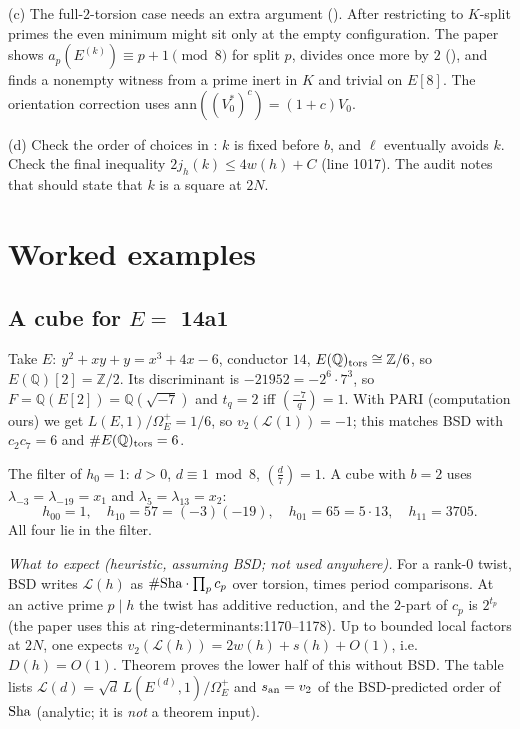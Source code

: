 \documentclass[11pt]{article}
\theoremstyle{remark}
\newcommand{\Q}{\mathbb Q}
\newcommand{\Z}{\mathbb Z}
\newcommand{\cL}{\mathcal L}
\newcommand{\Sha}{\text{\rm Sha}}
\newcommand{\src}[2]{\textsf{\small #1:#2}}
\begin{document}
(c) The full-$2$-torsion case needs an extra argument
(). After restricting to $K$-split primes the even
minimum might sit only at the empty configuration. The paper shows
$a_p(E^{(k)})\equiv p+1\pmod8$ for split $p$, divides once more by $2$
(), and finds a nonempty witness from a prime inert
in $K$ and trivial on $E[8]$. The orientation correction
 uses $\mathrm{ann}((V_0^*)^c)=(1+c)V_0$.

(d) Check the order of choices in : $k$ is fixed before
$b$, and $\ell$ eventually avoids $k$. Check the final inequality
$2j_h(k)\le4w(h)+C$ (line 1017). The audit notes that
 should state that $k$ is a square at $2N$.

\section{Worked examples}
\label{sec:examples}

\subsection{A cube for $E=$ 14a1}
Take $E:\ y^2+xy+y=x^3+4x-6$, conductor $14$, $E(\Q)_{\rm tors}\cong\Z/6$, so
$E(\Q)[2]=\Z/2$. Its discriminant is $-21952=-2^6\cdot7^3$, so
$F=\Q(E[2])=\Q(\sqrt{-7})$ and $t_q=2$ iff $(\frac{-7}q)=1$. With PARI
(computation ours) we get $L(E,1)/\Omega^+_E=1/6$, so $v_2(\cL(1))=-1$; this
matches BSD with $c_2c_7=6$ and $\#E(\Q)_{\rm tors}=6$.

The filter of $h_0=1$: $d>0$, $d\equiv1\bmod8$, $(\frac d7)=1$. A cube with
$b=2$ uses $\lambda_{-3}=\lambda_{-19}=x_1$ and $\lambda_5=\lambda_{13}=x_2$:
\[
 h_{00}=1,\quad h_{10}=57=(-3)(-19),\quad h_{01}=65=5\cdot13,\quad
 h_{11}=3705.
\]
All four lie in the filter.

\emph{What to expect (heuristic, assuming BSD; not used anywhere).} For a
rank-$0$ twist, BSD writes $\cL(h)$ as $\#\Sha\cdot\prod_pc_p$ over torsion,
times period comparisons. At an active prime $p\mid h$ the twist has
additive reduction, and the $2$-part of $c_p$ is $2^{t_p}$ (the paper uses
this at \src{ring-determinants}{1170--1178}). Up to bounded local factors at
$2N$, one expects $v_2(\cL(h))=2w(h)+s(h)+O(1)$, i.e.\ $D(h)=O(1)$.
Theorem  proves the lower half of this without BSD. The table lists $\cL(d)=\sqrt d\,L(E^{(d)},1)/
\Omega^+_E$ and $s_{\rm an}=v_2$ of the BSD-predicted order of $\Sha$
(analytic; it is \emph{not} a theorem input).
\end{document}
